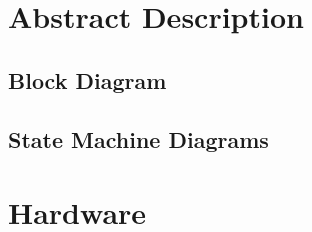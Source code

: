 \documentclass[11pt]{article}
\begin{document}
    
    \pagebreak
    

    \section{Abstract Description}\label{sec:abstract-description}
    \subsection{Block Diagram}\label{subsec:block-diagram}
    \subsection{State Machine Diagrams}\label{subsec:state-machine-diagrams}

    \section{Hardware}\label{sec:hardware}
\end{document}
